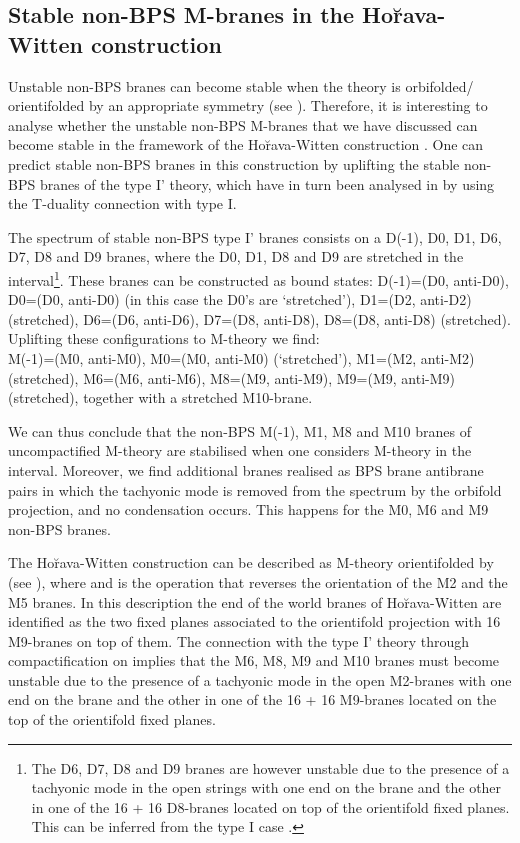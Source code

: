 \documentclass[12pt,a4paper]{article}
\begin{document}
\subsection{Stable non-BPS M-branes in the Ho\u{r}ava-Witten construction}

Unstable non-BPS branes can become stable when
the theory is orbifolded/ orientifolded by an appropriate 
symmetry (see \cite{reva}). 
Therefore, it is interesting to analyse whether the 
unstable non-BPS M-branes that we have discussed can become stable in
the framework of the Ho\u{r}ava-Witten construction \cite{HW}.
One can predict stable non-BPS
branes in this construction by uplifting the stable non-BPS branes of
the type I' theory, which have in turn been analysed in \cite{BGH} 
by using the T-duality connection with type I.

The spectrum of stable non-BPS type I' branes consists on a D(-1),
D0, D1, D6, D7, D8 and D9 branes, where the D0, D1, D8 and D9 are
stretched in the interval\footnote{The D6, D7, D8 and D9
branes are however unstable due to the presence of a tachyonic mode
in the open strings with one end on the brane and the other in one
of the 16 + 16 D8-branes located on top of the orientifold
fixed planes. This can be inferred from the type I
case \cite{FGLS}.}.
These branes can be constructed as bound
states: D(-1)=(D0, anti-D0), D0=(D0, anti-D0) (in this case the
D0's are `stretched'), D1=(D2, anti-D2) (stretched),
D6=(D6, anti-D6), D7=(D8, anti-D8), D8=(D8, anti-D8) (stretched).  
Uplifting these configurations
to M-theory we find: \\
M(-1)=(M0, anti-M0), M0=(M0, anti-M0) 
(`stretched'), M1=(M2, anti-M2) (stretched), M6=(M6, anti-M6),
M8=(M9, anti-M9), M9=(M9, anti-M9) (stretched), together with a
stretched M10-brane. 

We can thus conclude that the non-BPS M(-1), M1, M8 and M10 
branes of uncompactified M-theory are
stabilised when one considers M-theory in the interval. Moreover, we
find additional branes realised as BPS brane
antibrane pairs in which the tachyonic mode is removed from the
spectrum by the orbifold projection, and no condensation occurs.
This happens for the M0, M6 and M9 non-BPS branes.

The Ho\u{r}ava-Witten construction can be described 
as M-theory orientifolded by \coordHE{} (see \cite{BEHHLvdS}),
where \coordHE{} and 
\myHighlight{${\hat \Omega}$}\coordHE{} is the operation that reverses the orientation
of the M2 and the M5 branes. 
In this description
the end of the world branes of Ho\u{r}ava-Witten are identified as
the two fixed planes associated to the orientifold projection with
16 M9-branes on top of them. The connection with the
type I' theory through compactification on \coordHE{} implies that the
M6, M8, M9 and M10 branes must become unstable due to the presence of
a tachyonic mode in the open M2-branes with one end on the brane
and the other in one of the 16 + 16 M9-branes located on the top of the 
orientifold fixed planes.
\end{document}
